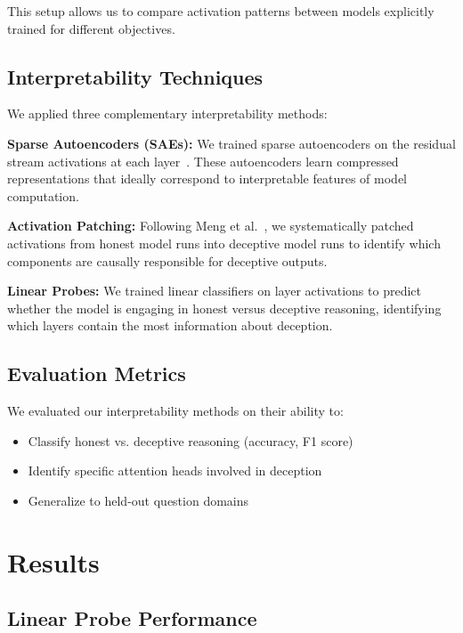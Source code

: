 \documentclass[midterm]{sparreport}
\begin{document}
This setup allows us to compare activation patterns between models explicitly trained for different objectives.

\subsection{Interpretability Techniques}

We applied three complementary interpretability methods:

\textbf{Sparse Autoencoders (SAEs):} We trained sparse autoencoders on the residual stream activations at each layer~\cite{cunningham2023sparse}. These autoencoders learn compressed representations that ideally correspond to interpretable features of model computation.

\textbf{Activation Patching:} Following Meng et al.~\cite{meng2022locating}, we systematically patched activations from honest model runs into deceptive model runs to identify which components are causally responsible for deceptive outputs.

\textbf{Linear Probes:} We trained linear classifiers on layer activations to predict whether the model is engaging in honest versus deceptive reasoning, identifying which layers contain the most information about deception.

\subsection{Evaluation Metrics}

We evaluated our interpretability methods on their ability to:
\begin{itemize}
  \item Classify honest vs. deceptive reasoning (accuracy, F1 score)
  \item Identify specific attention heads involved in deception
  \item Generalize to held-out question domains
\end{itemize}

\section{Results}

\subsection{Linear Probe Performance}
\end{document}

